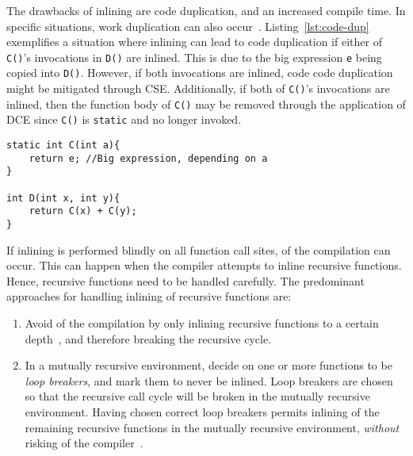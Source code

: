 The drawbacks of inlining are code duplication, and an increased compile time.
In specific situations, work duplication can also occur~\cite{GHCPaper}.
Listing~\ref{lst:code-dup} exemplifies a situation where inlining can lead to
code duplication if either of \lstinline!C()!'s invocations in \lstinline!D()!
are inlined. This is due to the big expression \lstinline!e! being copied into
\lstinline!D()!. However, if both invocations are inlined, code code duplication
might be mitigated through CSE. Additionally, if both of \lstinline!C()!'s
invocations are inlined, then the function body of \lstinline!C()! may be
removed through the application of DCE since \lstinline!C()! is
\lstinline!static! and no longer invoked.

\begin{centering}
	\noindent\begin{minipage}{\textwidth}
		\begin{CenteredBox}
		\begin{lstlisting}[style=global_customcpp]
static int C(int a){
	return e; //Big expression, depending on a
}

int D(int x, int y){
	return C(x) + C(y);
}
		\end{lstlisting}
		\end{CenteredBox}
	\end{minipage}
	\label{lst:code-dup}
\end{centering}

If inlining is performed blindly on all function call sites,  of
the compilation can occur. This can happen when the compiler attempts to inline
recursive functions. Hence, recursive functions need to be handled carefully.
The predominant approaches for handling inlining of recursive functions are:

\begin{enumerate}

	\item Avoid  of the compilation by only inlining recursive
functions to a certain depth~\cite{GHCPaper,InlineWhenHowSerrano}, and
therefore breaking the recursive cycle.

	\item In a mutually recursive environment, decide on one or more functions
to be \textit{loop breakers}, and mark them to never be inlined. Loop breakers
are chosen so that the recursive call cycle will be broken in the mutually
recursive environment. Having chosen correct loop breakers permits inlining of
the remaining recursive functions in the mutually recursive environment,
\textit{without} risking  of the
compiler~\cite{BasMscThesis,GHCPaper}.

\end{enumerate}

